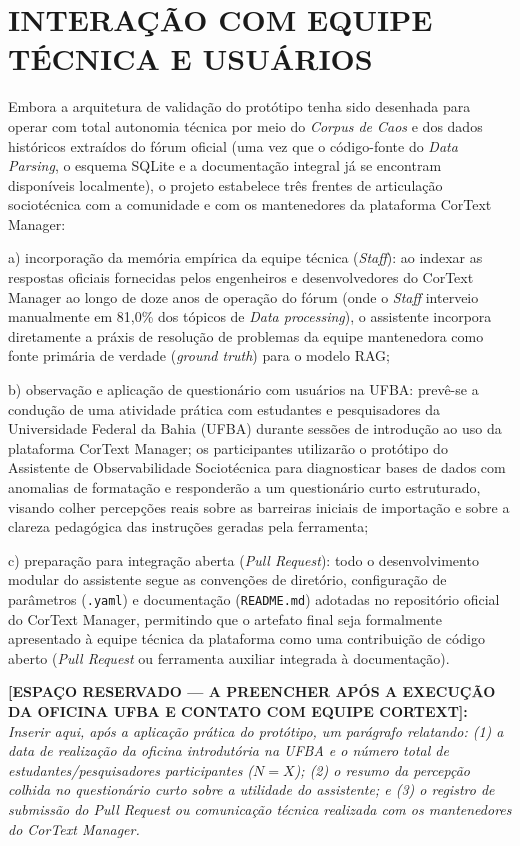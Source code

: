 \documentclass[
	oneside,
	a4paper,
	12pt,
	chapter=TITLE,
	section=TITLE,
	english,
	brazilian
]{abntex2}
\begin{document}
\FloatBarrier
\section{INTERAÇÃO COM EQUIPE TÉCNICA E USUÁRIOS}\label{sec:interacao_com_equipe_tecnica_e_usuarios}


Embora a arquitetura de validação do protótipo tenha sido desenhada para operar com total autonomia técnica por meio do \textit{Corpus de Caos} e dos dados históricos extraídos do fórum oficial (uma vez que o código-fonte do \textit{Data Parsing}, o esquema SQLite e a documentação integral já se encontram disponíveis localmente), o projeto estabelece três frentes de articulação sociotécnica com a comunidade e com os mantenedores da plataforma CorText Manager:

\par\indent a) incorporação da memória empírica da equipe técnica (\textit{Staff}): ao indexar as respostas oficiais fornecidas pelos engenheiros e desenvolvedores do CorText Manager ao longo de doze anos de operação do fórum (onde o \textit{Staff} interveio manualmente em 81,0\% dos tópicos de \textit{Data processing}), o assistente incorpora diretamente a práxis de resolução de problemas da equipe mantenedora como fonte primária de verdade (\textit{ground truth}) para o modelo RAG;
\par\indent b) observação e aplicação de questionário com usuários na UFBA: prevê-se a condução de uma atividade prática com estudantes e pesquisadores da Universidade Federal da Bahia (UFBA) durante sessões de introdução ao uso da plataforma CorText Manager; os participantes utilizarão o protótipo do Assistente de Observabilidade Sociotécnica para diagnosticar bases de dados com anomalias de formatação e responderão a um questionário curto estruturado, visando colher percepções reais sobre as barreiras iniciais de importação e sobre a clareza pedagógica das instruções geradas pela ferramenta;
\par\indent c) preparação para integração aberta (\textit{Pull Request}): todo o desenvolvimento modular do assistente segue as convenções de diretório, configuração de parâmetros (\texttt{.yaml}) e documentação (\texttt{README.\allowbreak md}) adotadas no repositório oficial do CorText Manager, permitindo que o artefato final seja formalmente apresentado à equipe técnica da plataforma como uma contribuição de código aberto (\textit{Pull Request} ou ferramenta auxiliar integrada à documentação).

\begin{citacao}
\textbf{[ESPAÇO RESERVADO — A PREENCHER APÓS A EXECUÇÃO DA OFICINA UFBA E CONTATO COM EQUIPE CORTEXT]:} \textit{Inserir aqui, após a aplicação prática do protótipo, um parágrafo relatando: (1) a data de realização da oficina introdutória na UFBA e o número total de estudantes/pesquisadores participantes ($N = X$); (2) o resumo da percepção colhida no questionário curto sobre a utilidade do assistente; e (3) o registro de submissão do Pull Request ou comunicação técnica realizada com os mantenedores do CorText Manager.}
\end{citacao}
\end{document}
